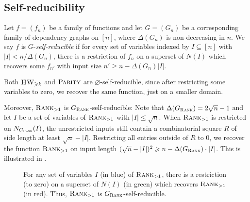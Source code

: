 \documentclass{article}
\begin{document}
\subsection{Self-reducibility}

\begin{boxdefinition}
    Let $f=(f_n)$ be a family of functions and let $G=(G_n)$ be a corresponding family of dependency graphs on $[n]$, where $\Delta(G_n)$ is non-decreasing in $n$. We say $f$ is $G$-\emph{self-reducible} if for every set of variables indexed by $I\subseteq [n]$ with $|I|<n/\Delta(G_n)$, there is a restriction of $f_n$ on a superset of $N(I)$ which recovers some $f_{n'}$ with input size $n' \geq n - \Delta(G_n)|I|$.    
\end{boxdefinition}

\begin{example}\label{ex:self-reducibility}
    Both $\operatorname{\textsc{HW}}_{\geqslant k}$ and $\operatorname{\textsc{Parity}}$ are $\varnothing$-self-reducible, since after restricting some variables to zero, we recover the same function, just on a smaller domain.

    Moreover, $\operatorname{\textsc{Rank}}_{>1}$ is $G_{\Rank}$-self-reducible:
    Note that $\Delta(G_{\operatorname{\textsc{Rank}}}) = 2\sqrt{n}-1$ and let $I$ be a set of variables of $\operatorname{\textsc{Rank}}_{>1}$ with $|I| \leq \sqrt{n}$.
    When $\operatorname{\textsc{Rank}}_{>1}$ is restricted on $N_{G_{\operatorname{\textsc{Rank}}}}(I)$, the unrestricted inputs still contain a combinatorial square $R$ of side length at least $\sqrt{n}-|I|$. Restricting all entries outside of $R$ to $0$, we recover the function $\operatorname{\textsc{Rank}}_{>1}$ on input length $(\sqrt{n} - |I|)^2 \geqslant n - \Delta(G_{\operatorname{\textsc{Rank}}})\cdot |I|$. This is illustrated in .
\end{example}

\begin{figure}[t]
    \centering
    \begin{minipage}{0.45\textwidth}
        \centering
        
        \vspace{-2em}
        \caption{After fixing some entries on a $G_{\Rank}$-independent set (in blue), we can still choose to either create a $1$-rectangle (in red), or to avoid it. Thus, $\res_G(\Rank_{>1}) = \infty$.}
        \label{fig:resilience}
    \end{minipage}
    \hfill
    \begin{minipage}{0.45\textwidth}
        \centering
        
        \vspace{-2em}
        \caption{For any set of variables $I$ (in blue) of $\operatorname{\textsc{Rank}}_{>1}$, there is a restriction (to zero) on a superset of $N(I)$ (in green) which recovers $\operatorname{\textsc{Rank}}_{>1}$ (in red). Thus, $\operatorname{\textsc{Rank}}_{>1}$ is $G_{\Rank}$-self-reducible.}
        \label{fig:self-reducibility}
    \end{minipage}
\end{figure}
\end{document}
